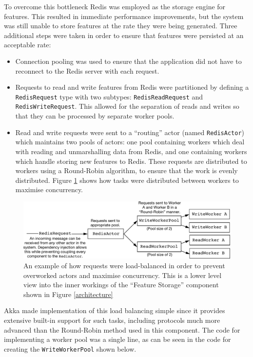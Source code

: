 \documentclass{l4proj}
\newcommand{\code}[1]{\texttt{#1}}
\begin{document}
        To overcome this bottleneck Redis was employed as the storage engine for features. This resulted in immediate performance improvements, but the system was still unable to store features at the rate they were being generated. Three additional steps were taken in order to ensure that features were persisted at an acceptable rate:
        
        \begin{itemize}
        \item Connection pooling was used to ensure that the application did not have to reconnect to the Redis server with each request.
        \item Requests to read and write features from Redis were partitioned by defining a \code{RedisRequest} type with two subtypes: \code{RedisReadRequest} and \code{RedisWriteRequest}. This allowed for the separation of reads and writes so that they can be processed by separate worker pools.
        \item Read and write requests were sent to a ``routing'' actor (named \code{RedisActor}) which maintains two pools of actors: one pool containing workers which deal with reading and unmarshalling data from Redis, and one containing workers which handle storing new features to Redis. These requests are distributed to workers using a Round-Robin algorithm, to ensure that the work is evenly distributed. Figure \ref{loadbalancing} shows how tasks were distributed between workers to maximise concurrency.
        \end{itemize}


\begin{figure}
\centering
\includegraphics[scale=0.7]{loadbalancing.pdf}
\caption{An example of how requests were load-balanced in order to prevent overworked actors and maximise concurrency. This is a lower level view into the inner workings of the ``Feature Storage'' component shown in Figure \ref{architecture}}
\label{loadbalancing}
\end{figure}
        
        Akka made implementation of this load balancing simple since it provides extensive built-in support for such tasks, including protocols much more advanced than the Round-Robin method used in this component. The code for implementing a worker pool was a single line, as can be seen in the code for creating the \code{WriteWorkerPool} shown below.
        
\end{document}
